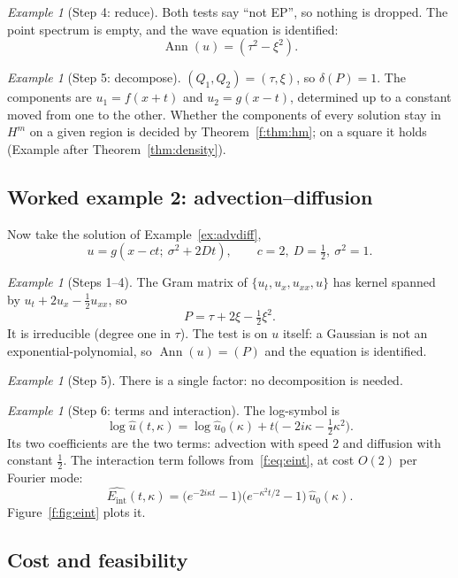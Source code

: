 \documentclass[11pt]{article}
\theoremstyle{plain}
\theoremstyle{definition}
\theoremstyle{remark}
\newtheorem{example}[theorem]{Example}
\DeclareMathOperator{\Ann}{Ann}             %
\newcommand{\Eint}{E_{\mathrm{int}}}        %
\begin{document}
\begin{example}[{Step 4: reduce}]
Both tests say ``not EP'', so nothing is dropped. The point spectrum is empty, and the wave equation is identified:
\[
\Ann(u)=(\tau^2-\xi^2).
\]
\end{example}

\begin{example}[{Step 5: decompose}]
$(Q_1,Q_2)=(\tau,\xi)$, so $\delta(P)=1$. The components are $u_1=f(x+t)$ and $u_2=g(x-t)$, determined up to a constant moved from one to the other. Whether the components of every solution stay in $H^m$ on a given region is decided by Theorem~\ref{f:thm:hm}; on a square it holds (Example after Theorem~\ref{thm:density}).
\end{example}

\subsection{Worked example 2: advection--diffusion}

Now take the solution of Example~\ref{ex:advdiff},
\[
u=g(x-ct;\ \sigma^2+2Dt),\qquad c=2,\ D=\tfrac12,\ \sigma^2=1 .
\]

\begin{example}[{Steps 1--4}]
The Gram matrix of $\{u_t,u_x,u_{xx},u\}$ has kernel spanned by $u_t+2u_x-\tfrac12u_{xx}$, so
\[
P=\tau+2\xi-\tfrac12\xi^2 .
\]
It is irreducible (degree one in $\tau$). The test is on $u$ itself: a Gaussian is not an exponential-polynomial, so $\Ann(u)=(P)$ and the equation is identified.
\end{example}

\begin{example}[{Step 5}]
There is a single factor: no decomposition is needed.
\end{example}

\begin{example}[{Step 6: terms and interaction}]
The log-symbol is
\[
\log\hat u(t,\kappa)=\log\hat u_0(\kappa)+t\big(-2i\kappa-\tfrac12\kappa^2\big).
\]
Its two coefficients are the two terms: advection with speed $2$ and diffusion with constant $\tfrac12$. The interaction term follows from~\eqref{f:eq:eint}, at cost $O(2)$ per Fourier mode:
\[
\widehat{\Eint}(t,\kappa)=\big(e^{-2i\kappa t}-1\big)\big(e^{-\kappa^2t/2}-1\big)\,\hat u_0(\kappa).
\]
Figure~\ref{f:fig:eint} plots it.
\end{example}

\subsection{Cost and feasibility}
\end{document}
